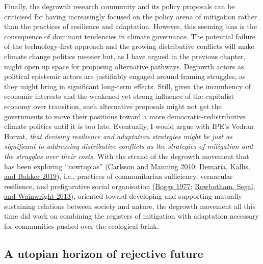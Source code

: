 \documentclass[a4paper, nobind]{templates/ociamthesis}
\begin{document}
Finally, the degrowth research community and its policy proposals can be criticised for having increasingly focused on the policy arena of mitigation rather than the practices of resilience and adaptation. However, this seeming bias is the consequence of dominant tendencies in climate governance. The potential failure of the technology-first approach and the growing distributive conflicts will make climate change politics messier but, as I have argued in the previous chapter, might open up space for proposing alternative pathways. Degrowth actors as political epistemic actors are justifiably engaged around framing struggles, as they might bring in significant long-term effects. Still, given the incumbency of economic interests and the weakened yet strong influence of the capitalist economy over transition, such alternative proposals might not get the governments to move their positions toward a more democratic-redistributive climate politics until it is too late. Eventually, I would argue with IPE's Vedran Horvat, \emph{that devising resilience and adaptation strategies might be just as significant to addressing distributive conflicts as the strategies of mitigation and the struggles over their costs.} With the strand of the degrowth movement that has been exploring ``nowtopias'' (\protect\hyperlink{ref-carlsson_nowtopia_2010}{Carlsson and Manning 2010}; \protect\hyperlink{ref-demaria_geographies_2019}{Demaria, Kallis, and Bakker 2019}), i.e., practices of communitarian sufficiency, vernacular resilience, and prefigurative social organisation (\protect\hyperlink{ref-boggs_marxism_1977a}{Boggs 1977}; \protect\hyperlink{ref-rowbotham_fragments_2013}{Rowbotham, Segal, and Wainwright 2013}), oriented toward developing and supporting mutually sustaining relations between society and nature, the degrowth movement all this time did work on combining the registers of mitigation with adaptation necessary for communities pushed over the ecological brink.

\hypertarget{a-utopian-horizon-of-rejective-future}{%
\subsection{A utopian horizon of rejective future}\label{a-utopian-horizon-of-rejective-future}}
\end{document}

